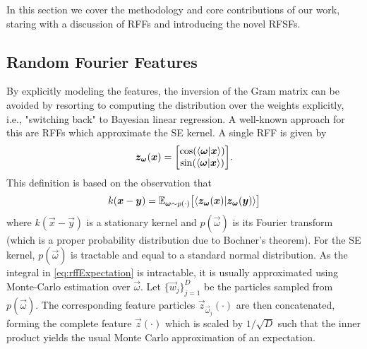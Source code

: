In this section we cover the methodology and core contributions of our work, staring with a discussion of \acp{RFF} and introducing the novel \acp{RFSF}.

\subsection{Random Fourier Features}
	By explicitly modeling the features, the inversion of the Gram matrix can be avoided by resorting to computing the distribution over the weights explicitly, i.e., "switching back" to Bayesian linear regression.
	A well-known approach for this are \acp{RFF}\cite{rahimiRandomFeaturesLargeScale2007} which approximate the \ac{SE} kernel.
	A single \ac{RFF} is given by
	\begin{equation}
		\vec{z}_{\vec{\omega}}(\vec{x}) =
			\begin{bmatrix}
				\cos(\ip{\vec{\omega}}{\vec{x}}) \\
				\sin(\ip{\vec{\omega}}{\vec{x}})
			\end{bmatrix}\!.
		\label{eq:rffFeature}
	\end{equation}
	This definition is based on the observation that
	\begin{equation}
		k(\vec{x} - \vec{y}) = \E_{\vec{\omega} \sim p(\cdot)}\bigl[ \ip{\vec{z}_{\vec{\omega}}(\vec{x})}{\vec{z}_{\vec{\omega}}(\vec{y})} \bigr]
		\label{eq:rffExpectation}
	\end{equation}
	where $k(\vec{x} - \vec{y})$ is a stationary kernel and $p(\vec{\omega})$ is its Fourier transform (which is a proper probability distribution due to Bochner's theorem\cite{steinInterpolationSpatialData1999}).
	For the \ac{SE} kernel, $p(\vec{\omega})$ is tractable and equal to a standard normal distribution\cite{rasmussenGaussianProcessesMachine2006}.
	As the integral in \cref{eq:rffExpectation} is intractable, it is usually approximated using Monte-Carlo estimation over $\vec{\omega}$.
	Let $\{ \vec{w}_j \}_{j = 1}^{D}$ be the particles sampled from $p(\vec{\omega})$.
	The corresponding feature particles $\vec{z}_{\vec{\omega}_j}(\cdot)$ are then concatenated, forming the complete feature $\vec{z}(\cdot)$ which is scaled by $1/\sqrt{D}$ such that the inner product yields the usual Monte Carlo approximation of an expectation.

